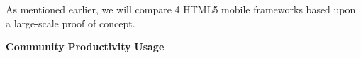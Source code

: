 \documentclass[a4paper]{artikel3}
\renewcommand{\paragraph}[1]{{\bf #1} }
\begin{document}
As mentioned earlier,  we will compare 4 HTML5 mobile frameworks based upon a large-scale proof of concept.  



\paragraph{Community}%
% 
% 
\paragraph{Productivity}%
% 
% 
\paragraph{Usage}%
% 
% 
\end{document}
